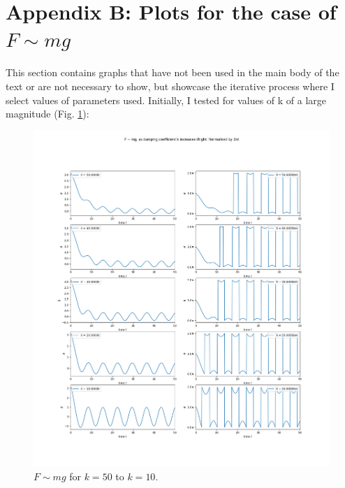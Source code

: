 \documentclass[10pt, twocolumn]{article}
\begin{document}
\section{Appendix B: Plots for the case of $F \sim{mg}$}{\label{plotsFmg}}
This section contains graphs that have not been used in the main body of the text or are not necessary to show, but showcase the iterative process where I select values of parameters used. Initially, I tested for values of k of a large magnitude (Fig. \ref{k 50 to 10}):
\newpage
\begin{figure}[H]
    \centering
    \includegraphics[width = \columnwidth]{Projects/ForcedSimplePendulum/Plots/F~mg as damping coefficient k increases from 50 to 10.png}
    \caption{$F \sim{mg}$ for $k = 50$ to $k = 10$.}
    \label{k 50 to 10}
\end{figure}
\end{document}
